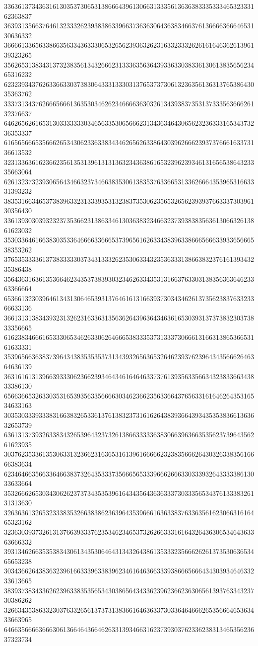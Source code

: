 33636137343631613035373065313866643961306631333561363638333533346532333162363837
36393135663764613233326239383863396637363630643638346637613666636664653130636332
36666133656338663563343633306532656239363262316332333262616164636261396139323265
35626531383431373238356134326662313336356364393363303833613061383565623465316232
62323934376263366330373830643331333031376537373061323635613631376538643035363762
33373134376266656661363530346262346666363032613439383735313733356366626132376637
64626562616531303333333034656335306566623134363464306562323633316534373236353337
61656566653566626534306233633834346265626338643039626662393737666163373136613532
32313363616236623561353139613131363234363861653239623934613165653864323335663064
62613237323930656434663237346638353061383537633665313362666435396531663331393232
38353166346537383963323133393531323837353062356532656239393766333730396130356430
33613930303932323735366231386334613036383234663237393838356361306632613861623032
35303364616638303533646666336665373965616263343839633866656663393365666538353262
37653533336137383333303734313332623530633432353633313866383237616139343235386438
35643631636135366462343537383930323462633435313166376330313835636364623363366664
65366132303964613431306465393137646161316639373034346261373562383763323366633136
36613131383439323132623163363135636264396364346361653039313737383230373833356665
61623834666165333065346263306264666538333537313337306661316631386536653161633331
35396566363837396434383535353731343932656365326462393762396434356662646364636139
36316161313966393330623662393464346164646337376139356335663432383366343833386130
65663665326330353165393563356666303462366235633664376563316164626435316534633163
30353033393338316638326533613761383237316162643839366439343535383661363632653739
63613137393263383432653964323732613866333336383066396366353562373964356261623935
30376235336135306331323662316365316139616666623238356662643032633835616666383634
62346466356633646638373264353337356665653339666266633033393264333338613033633664
35326662653034306262373734353539616434356436363337303335653437613338326131313630
32636361326532333835326638386236396435396661636338376336356162306631616465323162
32363039373261313766393337623534623465373262663331616432643630653464363363666332
39313462663535383430613435306464313432643861353332356662626137353063653465653238
30343662643836323961663339633839623461646366333938666566643430393464633233613665
38393738343362623963383535653430386564343362396236623630656139376334323730386262
32663435386332303763326561373731383661646363373033646466626535666465363433663965
64663566663666306136646436646263313934663162373930376233623831346535623637323734
